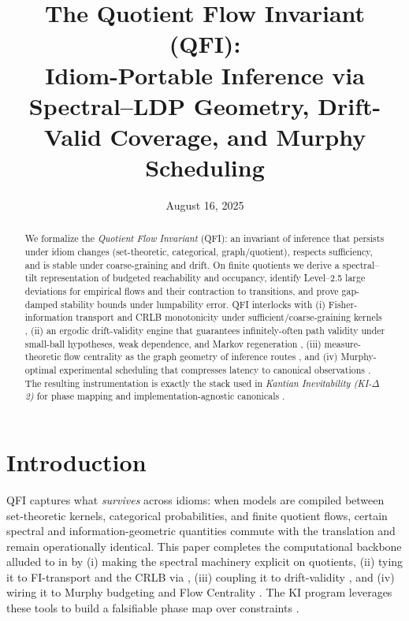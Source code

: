 \documentclass[11pt]{article}
\title{The Quotient Flow Invariant (QFI):\\
Idiom-Portable Inference via Spectral--LDP Geometry, Drift-Valid Coverage, and Murphy Scheduling}
\author{}
\date{August 16, 2025}
\theoremstyle{plain}
\theoremstyle{definition}
\theoremstyle{remark}
\newcommand{\1}{\mathbbm{1}}
\begin{document}
\maketitle

\begin{abstract}
We formalize the \emph{Quotient Flow Invariant} (QFI): an invariant of inference that persists under idiom changes (set-theoretic, categorical, graph/quotient), respects sufficiency, and is stable under coarse-graining and drift. On finite quotients we derive a spectral--tilt representation of budgeted reachability and occupancy, identify Level--2.5 large deviations for empirical flows and their contraction to transitions, and prove gap-damped stability bounds under lumpability error. QFI interlocks with (i) Fisher-information transport and CRLB monotonicity under sufficient/coarse-graining kernels \parencite{elliott2025idiom,CoverThomas2006,AmariNagaoka2000,Cencov1982,Blackwell1953}, (ii) an ergodic drift-validity engine that guarantees infinitely-often path validity under small-ball hypotheses, weak dependence, and Markov regeneration \parencite{elliott2025drift,KochenStone1964,Freedman1975,MeynTweedie2009}, (iii) measure-theoretic flow centrality as the graph geometry of inference routes \parencite{elliott2025flow}, and (iv) Murphy-optimal experimental scheduling that compresses latency to canonical observations \parencite{elliott2025pmb}. The resulting instrumentation is exactly the stack used in \emph{Kantian Inevitability (KI-\(\Delta\)2)} for phase mapping and implementation-agnostic canonicals \parencite{elliott2025ki}.
\end{abstract}

\section{Introduction}
QFI captures what \emph{survives} across idioms: when models are compiled between set-theoretic kernels, categorical probabilities, and finite quotient flows, certain spectral and information-geometric quantities commute with the translation and remain operationally identical. This paper completes the computational backbone alluded to in \parencite{elliott2025qfi} by (i) making the spectral machinery explicit on quotients, (ii) tying it to FI-transport and the CRLB via \parencite{elliott2025idiom}, (iii) coupling it to drift-validity \parencite{elliott2025drift}, and (iv) wiring it to Murphy budgeting \parencite{elliott2025pmb} and Flow Centrality \parencite{elliott2025flow}. The KI program leverages these tools to build a falsifiable phase map over constraints \parencite{elliott2025ki}.
\end{document}
